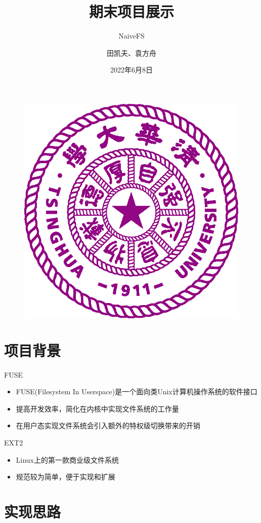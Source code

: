 \documentclass{beamer}
\author{田凯夫、袁方舟}
\title{期末项目展示}
\subtitle{NaiveFS}
\institute{清华大学计算机科学与技术系}
\date{2022年6月8日}
\begin{document}
\kaishu
\begin{frame}
    \titlepage
    \begin{figure}[htpb]
        \begin{center}
            \includegraphics[width=0.2\linewidth]{pic/Tsinghua_University_Logo.eps}
        \end{center}
    \end{figure}
\end{frame}

\begin{frame}
    \tableofcontents[sectionstyle=show,subsectionstyle=show/shaded/hide,subsubsectionstyle=show/shaded/hide]
\end{frame}


\section{项目背景}

\begin{frame}{FUSE}
    \begin{itemize}[<+-| alert@+>] %
        \item FUSE(Filesystem In Userspace)是一个面向类Unix计算机操作系统的软件接口
        \item 提高开发效率，简化在内核中实现文件系统的工作量
        \item 在用户态实现文件系统会引入额外的特权级切换带来的开销
    \end{itemize}
\end{frame}

\begin{frame}{EXT2}
    \begin{itemize}[<+-| alert@+>] %
        \item Linux上的第一款商业级文件系统
        \item 规范较为简单，便于实现和扩展
    \end{itemize}
\end{frame}


\section{实现思路}
\end{document}
